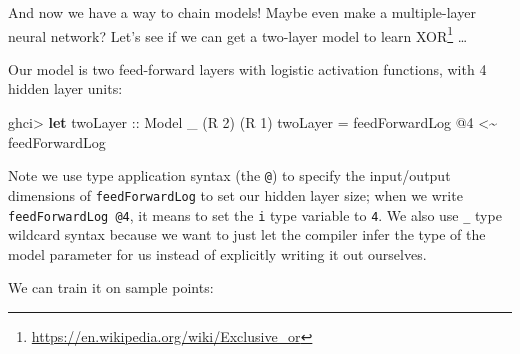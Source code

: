 \documentclass[]{article}
\newenvironment{Shaded}{}{}
\newcommand{\DataTypeTok}[1]{\textcolor[rgb]{0.56,0.13,0.00}{#1}}
\newcommand{\DecValTok}[1]{\textcolor[rgb]{0.25,0.63,0.44}{#1}}
\newcommand{\FunctionTok}[1]{\textcolor[rgb]{0.02,0.16,0.49}{#1}}
\newcommand{\KeywordTok}[1]{\textcolor[rgb]{0.00,0.44,0.13}{\textbf{#1}}}
\newcommand{\NormalTok}[1]{#1}
\newcommand{\OperatorTok}[1]{\textcolor[rgb]{0.40,0.40,0.40}{#1}}
\newcommand{\OtherTok}[1]{\textcolor[rgb]{0.00,0.44,0.13}{#1}}
\renewcommand{\href}[2]{#2\footnote{\url{#1}}}
\begin{document}
And now we have a way to chain models! Maybe even make a multiple-layer neural
network? Let's see if we can get a two-layer model to learn
\href{https://en.wikipedia.org/wiki/Exclusive_or}{XOR} \ldots{}

Our model is two feed-forward layers with logistic activation functions, with 4
hidden layer units:

\begin{Shaded}
\begin{Highlighting}[]
\NormalTok{ghci}\OperatorTok{\textgreater{}} \KeywordTok{let}\OtherTok{ twoLayer ::} \DataTypeTok{Model}\NormalTok{ \_ (}\DataTypeTok{R} \DecValTok{2}\NormalTok{) (}\DataTypeTok{R} \DecValTok{1}\NormalTok{)}
\NormalTok{          twoLayer }\OtherTok{=}\NormalTok{ feedForwardLog\textquotesingle{} }\OperatorTok{@}\DecValTok{4} \OperatorTok{\textless{}\textasciitilde{}}\NormalTok{ feedForwardLog\textquotesingle{}}
\end{Highlighting}
\end{Shaded}

Note we use type application syntax (the \texttt{@}) to specify the input/output
dimensions of \texttt{feedForwardLog\textquotesingle{}} to set our hidden layer
size; when we write \texttt{feedForwardLog\textquotesingle{}\ @4}, it means to
set the \texttt{i} type variable to \texttt{4}. We also use \texttt{\_} type
wildcard syntax because we want to just let the compiler infer the type of the
model parameter for us instead of explicitly writing it out ourselves.

We can train it on sample points:

\begin{Shaded}
\end{Shaded}
\end{document}
